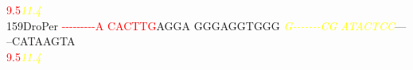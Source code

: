 \documentclass[11pt,twoside,reqno,a4paper]{article}
\begin{document}
{\hspace*{4\charwidth}\hspace*{7\charwidth}\hspace*{0\charwidth}\textcolor{Red}{9.5}\hspace*{1\charwidth}\hspace*{1\charwidth}\hspace*{1\charwidth}\hspace*{27\charwidth}\textit{\textcolor{Yellow}{11.4}}\hspace*{1\charwidth}\hspace*{1\charwidth}\hspace*{1\charwidth}\\
159\hspace*{1\charwidth}DroPer	\textcolor{Red}{-}\textcolor{Red}{-}\textcolor{Red}{-}\textcolor{Red}{-}\textcolor{Red}{-}\textcolor{Red}{-}\textcolor{Red}{-}\textcolor{Red}{-}\textcolor{Red}{-}\textcolor{Red}{A}	\textcolor{Red}{C}\textcolor{Red}{A}\textcolor{Red}{C}\textcolor{Red}{T}\textcolor{Red}{T}\textcolor{Red}{G}AGGA	GGGAGGTGGG	\textit{\textcolor{Yellow}{G}}\textit{\textcolor{Yellow}{-}}\textit{\textcolor{Yellow}{-}}\textit{\textcolor{Yellow}{-}}\textit{\textcolor{Yellow}{-}}\textit{\textcolor{Yellow}{-}}\textit{\textcolor{Yellow}{-}}\textit{\textcolor{Yellow}{-}}\textit{\textcolor{Yellow}{C}}\textit{\textcolor{Yellow}{G}}	\textit{\textcolor{Yellow}{A}}\textit{\textcolor{Yellow}{T}}\textit{\textcolor{Yellow}{A}}\textit{\textcolor{Yellow}{C}}\textit{\textcolor{Yellow}{T}}\textit{\textcolor{Yellow}{C}}\textit{\textcolor{Yellow}{C}}---	--CATAAGTA	\\
\hspace*{4\charwidth}\hspace*{7\charwidth}\hspace*{0\charwidth}\textcolor{Red}{9.5}\hspace*{1\charwidth}\hspace*{1\charwidth}\hspace*{1\charwidth}\hspace*{27\charwidth}\textit{\textcolor{Yellow}{11.4}}\hspace*{1\charwidth}\hspace*{1\charwidth}\hspace*{1\charwidth}\\
}
\end{document}
